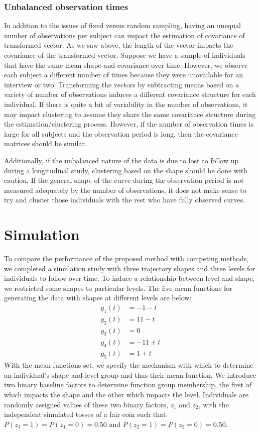 \documentclass[12pt]{article}
\begin{document}
\subsubsection{Unbalanced observation times}
In addition to the issues of fixed versus random sampling, having an unequal number of observations per subject can impact the estimation of covariance of transformed vector. As we saw above, the length of the vector impacts the covariance of the transformed vector. Suppose we have a sample of individuals that have the same mean shape and covariance over time. However, we observe each subject a different number of times because they were unavailable for an interview or two. Transforming the vectors by subtracting means based on a variety of number of observations induces a different covariance structure for each individual. If there is quite a bit of variability in the number of observations, it may impact clustering to assume they share the same covariance structure during the estimation/clustering process. However, if the number of observation times is large for all subjects and the observation period is long, then the covariance matrices should be similar. 

Additionally, if the unbalanced nature of the data is due to lost to follow up during a longitudinal study, clustering based on the shape should be done with caution. If the general shape of the curve during the observation period is not measured adequately by the number of observations, it does not make sense to try and cluster those individuals with the rest who have fully observed curves. 

\section{Simulation}
To compare the performance of the proposed method with competing methods, we completed a simulation study with three trajectory shapes and three levels for individuals to follow over time. To induce a relationship between level and shape, we restricted some shapes to particular levels. The five mean functions for generating the data with shapes at different levels are below:   \begin{align*}
g_{1}(t) &= -1 - t\\
g_{2}(t) &= 11 - t\\
g_{3}(t) &= 0\\
g_{4}(t) &= -11 + t\\
g_{5}(t) &= 1 + t
\end{align*} 
With the mean functions set, we specify the mechanism with which to determine an individual's shape and level group and thus their mean function. We introduce two binary baseline factors to determine function group membership, the first of which impacts the shape and the other which impacts the level. Individuals are randomly assigned values of these two binary factors, $z_{1}$ and $z_{2}$, with the independent simulated tosses of a fair coin such that $P(z_{1}=1) = P(z_{1}=0) = 0.50$ and $P(z_{2}=1) = P(z_{2}=0)=0.50$. 
\end{document}
